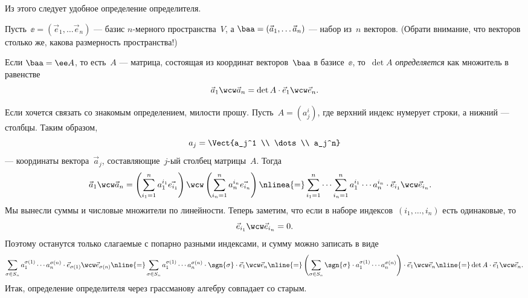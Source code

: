 Из этого следует удобное определение определителя.
\begin{definition}
	Пусть~$\ee = (\vec{e}_1, \dots \vec{e}_n)$ --- базис $n$-мерного пространства~$V$, а $\baa = (\vec{a}_1, \dots \vec{a}_n)$ --- набор из~$n$ векторов. (Обрати внимание, что векторов столько же, какова размерность пространства!)
	
	Если $\baa = \ee A$, то есть~$A$ --- матрица, состоящая из координат векторов~$\baa$ в базисе~$\ee$, то~$\det{A}$ \emph{определяется} как множитель в равенстве
	\[
		\vec{a}_1 \wcw \vec{a}_n
		=
		\det{A}
		\cdot
		\vec{e}_1 \wcw \vec{e}_n
		.
	\]
\end{definition}

Если хочется связать со знакомым определением, милости прошу. Пусть~$A = (a^i_j)$, где верхний индекс нумерует строки, а нижний --- столбцы. Таким образом,
\[
	a_j =
	\Vect{a_j^1 \\ \dots \\ a_j^n}
\]
--- координаты вектора~$\vec{a}_j$, составляющие~$j$-ый столбец матрицы~$A$. Тогда
\begin{align*}
	\vec{a}_1 \wcw \vec{a}_n
	&=
	\left( 
		\sum_{i_1 = 1}^{n}
			a_1^{i_1}
			\vec{e_{i_1}}
	\right)
	\wcw
	\left( 
		\sum_{i_n = 1}^{n}
			a_n^{i_n}
			\vec{e_{i_n}}
	\right)
	\nlinea{=}
	\sum_{i_1 = 1}^{n}
	\cdots
	\sum_{i_n = 1}^{n}
		a_1^{i_1}
		\cdots
		a_n^{i_n}
		\cdot
		\vec{e}_{i_1}
		\wcw
		\vec{e}_{i_n}
	.
\end{align*}
Мы вынесли суммы и числовые множители по линейности. Теперь заметим, что если в наборе индексов~$(i_1, \dots, i_n)$ есть одинаковые, то
\[
	\vec{e}_{i_1} \wcw \vec{e}_{i_n} = 0
	.
\]
Поэтому останутся только слагаемые с попарно разными индексами, и сумму можно записать в виде
\begin{multline*}
	\sum_{\sigma \in S_n}
	a_1^{\sigma(1)}
	\cdots
	a_n^{\sigma(n)}
	\cdot
	\vec{e}_{\sigma(1)}
	\wcw
	\vec{e}_{\sigma(n)}
	\nline{=}
	\sum_{\sigma \in S_n}
	a_1^{\sigma(1)}
	\cdots
	a_n^{\sigma(n)}
	\cdot
	\sgn{\sigma}
	\cdot
	\vec{e}_{1}
	\wcw
	\vec{e}_{n}
	\nline{=}
	\left(
		\sum_{\sigma \in S_n}
			\sgn{\sigma}
			\cdot
			a_1^{\sigma(1)}
			\cdots
			a_n^{\sigma(n)}
	\right)
	\cdot
	\vec{e}_{1}
	\wcw
	\vec{e}_{n}
	\nline{=}
	\det{A}
	\cdot
	\vec{e}_{1}
	\wcw
	\vec{e}_{n}
	.
\end{multline*}
Итак, определение определителя через грассманову алгебру совпадает со старым.

